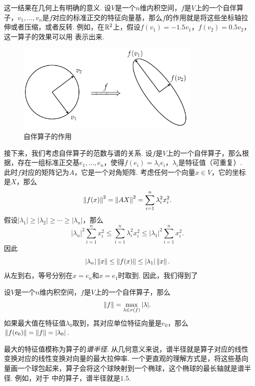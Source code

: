 这一结果在几何上有明确的意义. 设$V$是一个$n$维内积空间，$f$是$V$上的一个自伴算子，$v_1,\dots,v_n$是$f$对应的标准正交的特征向量基，那么$f$的作用就是将这些坐标轴拉伸或者压缩，或者反转. 例如，在$\mathbb{R}^2$上，假设$f(v_1)=-1.5v_1$，$f(v_2)=0.5v_2$，这一算子的效果可以用 表示出来. 

\begin{figure}[ht]
\centering
\includegraphics[width=0.8\textwidth]{figures/linear-algebra/self-adjoint.pdf}
\caption{自伴算子的作用}
\label{fig:symmetric-operator}
\end{figure}

接下来，我们考虑自伴算子的范数与谱的关系. 设$f$是$V$上的一个自伴算子，那么根据，存在一组标准正交基$e_1,\dots,e_n$，使得$f(e_i)=\lambda_i e_i$，$\lambda_i$是特征值（可重复）. 此时$f$对应的矩阵记为$A$，它是一个对角矩阵. 考虑任何一个向量$x\in V$，它的坐标是$X$，那么
\[
    \left\|f(x)\right\|^2=\left\|AX\right\|^2=\sum_{i=1}^n\lambda_i^2x_i^2.
\]
假设$|\lambda_1|\geq|\lambda_2|\geq\cdots\geq|\lambda_n|$，那么
\[
    |\lambda_n|^2\sum_{i=1}^n x_i^2\leq \sum_{i=1}^n\lambda_i^2x_i^2\leq |\lambda_1|^2\sum_{i=1}^n x_i^2.
\]
因此
\[
    |\lambda_n|\left\|x\right\|\leq \left\|f(x)\right\|\leq |\lambda_1|\left\|x\right\|.
\]
从左到右，等号分别在$x=e_n$和$x=e_1$时取到. 因此，我们得到了

\begin{theorem}\label{thm:symmetric-operator-norm}
    设$V$是一个$n$维内积空间，$f$是$V$上的一个自伴算子，那么
    \[\left\|f\right\|=\max_{\lambda\in\sigma(f)}|\lambda|.\]
    如果最大值在特征值$\lambda_0$取到，其对应单位特征向量是$e_0$，那么$\left\|f(e_0)\right\|=\left\|f\right\|=|\lambda_0|$.
\end{theorem}

最大的特征值模称为算子的\emph{谱半径}. 从几何意义来说，谱半径就是算子对应的线性变换对应的线性变换对向量的最大拉伸率. 一个更直观的理解方式是，将这些基向量画一个球包起来，算子会将这个球映射到一个椭球，这个椭球的最长轴就是谱半径. 例如，对于 中的算子，谱半径就是$1.5$. 